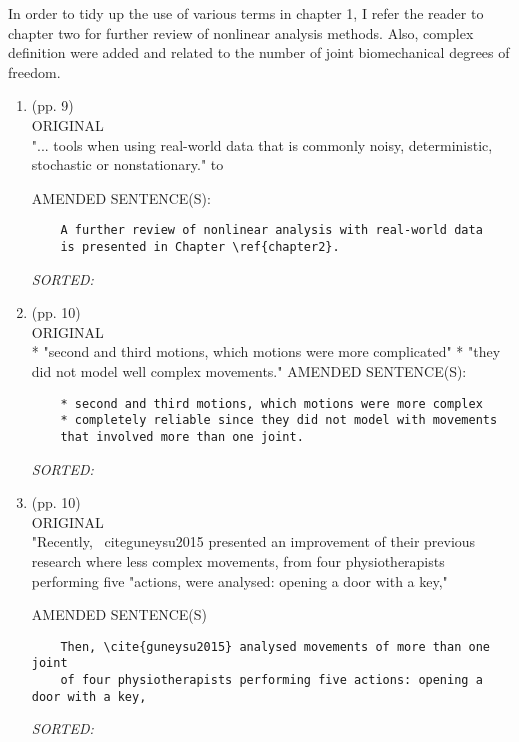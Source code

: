 \documentclass[12pt]{article}
\begin{document}
In order to tidy up the use of various terms in chapter 1,
I refer the reader to chapter two for further review of 
nonlinear analysis methods. Also, complex definition were added 
and related to the number of joint biomechanical degrees of freedom.
\begin{enumerate}


\item  (pp. 9)    \\
ORIGINAL \\
	"... tools when using real-world data that is commonly noisy, 
	deterministic, stochastic or nonstationary." to 

	AMENDED SENTENCE(S): \\
	\begin{verbatim}
	A further review of nonlinear analysis with real-world data 
	is presented in Chapter \ref{chapter2}.

	\end{verbatim}
	\textit{
	SORTED:  
	}
	\\


\item  (pp. 10)  \\ 
ORIGINAL \\
	* "second and third motions, which motions were more complicated"
	* "they did not model well complex movements."	
	AMENDED SENTENCE(S): \\
\begin{verbatim}
	* second and third motions, which motions were more complex
 	* completely reliable since they did not model with movements 
	that involved more than one joint.
	\end{verbatim}
	\textit{
	SORTED:  
	}
	\\




\item  (pp. 10)  \\

ORIGINAL \\
	"Recently, \ cite{guneysu2015} presented an improvement of their previous research
	where less complex movements, from four physiotherapists performing five 
	"actions, were analysed: opening a door with a key,"

	AMENDED SENTENCE(S) \\
\begin{verbatim}
	Then, \cite{guneysu2015} analysed movements of more than one joint 
	of four physiotherapists performing five actions: opening a door with a key,
	\end{verbatim}
	\textit{
	SORTED:  
	}
	\\





\end{enumerate}
\end{document}
